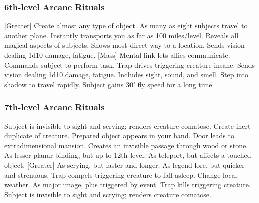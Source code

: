 \subsubsection{6th-level Arcane Rituals}
\begin{rituallist}
    [Greater] Create almost any type of object.
    \F As many as eight subjects travel to another plane.
     Instantly transports you as far as 100 miles/level.
      Reveals all magical aspects of subjects.
     Shows most direct way to a location.
     Sends vision dealing 1d10 damage, fatigue.
    [Mass] Mental link lets allies communicate.
     Commands subject to perform task.
     Trap drives triggering creature insane.
     Sends vision dealing 1d10 damage, fatigue.
     Includes sight, sound, and smell.
     Step into shadow to travel rapidly.
     Subject gains 30' fly speed for a long time.
\end{rituallist}

\subsubsection{7th-level Arcane Rituals}
\begin{rituallist}
     Subject is invisible to sight and scrying; renders creature comatose.
    \M Create inert duplicate of creature.
     Prepared object appears in your hand.
    \F Door leads to extradimensional mansion.
     Creates an invisible passage through wood or stone.
     As lesser planar binding, but up to 12th level.
     As teleport, but affects a touched object.
    [Greater] As scrying, but faster and longer.
     As legend lore, but quicker and strenuous.
     Trap compels triggering creature to fall asleep.
     Change local weather.
     As major image, plus triggered by event.
     Trap kills triggering creature.
     Subject is invisible to sight and scrying; renders creature comatose.
\end{rituallist}

